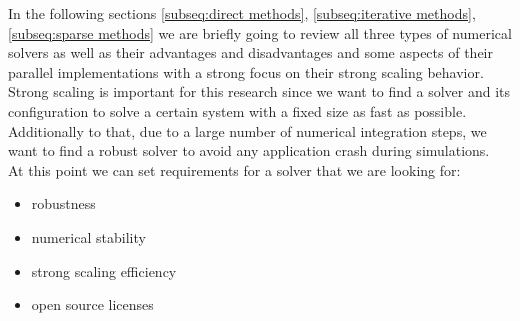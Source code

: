In the following sections \ref{subseq:direct methods}, \ref{subseq:iterative methods}, \ref{subseq:sparse methods} we are briefly going to review all three types of numerical solvers as well as their advantages and disadvantages and some aspects of their parallel implementations with a strong focus on their strong scaling behavior. Strong scaling is important for this research since we want to find a solver and its configuration to solve a certain system with a fixed size as fast as possible. Additionally to that, due to a large number of numerical integration steps, we want to find a robust solver to avoid any application crash during simulations.\\

At this point we can set requirements for a solver that we are looking for:\\

\begin{itemize}
	\item robustness
	\item numerical stability
	\item strong scaling efficiency
	\item open source licenses
\end{itemize}


